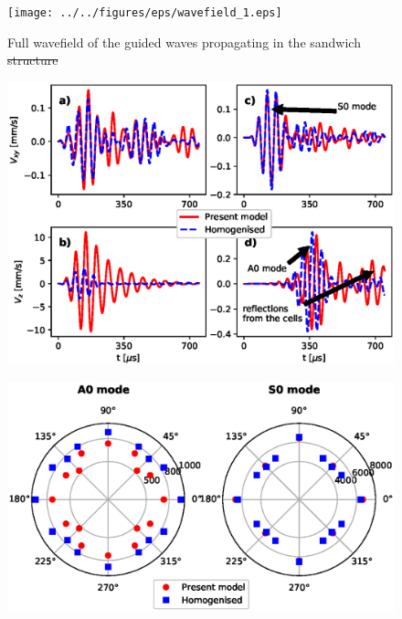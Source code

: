 \documentclass[materials,article,submit,moreauthors,pdftex]{Definitions/mdpi}
\providecommand{\DIFadd}[1]{{\protect\color{blue}{#1}}} %
\providecommand{\DIFdel}[1]{{\protect\color{red}\sout{#1}}}                      %
\providecommand{\DIFaddbegin}{} %
\providecommand{\DIFaddend}{} %
\providecommand{\DIFaddFL}[1]{\DIFadd{#1}} %
\providecommand{\DIFdelFL}[1]{\DIFdel{#1}} %
\providecommand{\DIFaddbeginFL}{} %
\providecommand{\DIFaddendFL}{} %
\providecommand{\DIFdelbeginFL}{} %
\providecommand{\DIFdelendFL}{} %
\begin{document}
\DIFaddbegin \label{comparison}
\DIFaddend \begin{figure}
	\begin{center}
		\DIFdelbeginFL %
\DIFdelendFL \DIFaddbeginFL \texttt{[image: ../../figures/eps/wavefield\_1.eps]}
	\DIFaddendFL \end{center}
	\caption{Full wavefield of the guided waves propagating in the sandwich \DIFdelbeginFL \DIFdelFL{structure}\DIFdelendFL \DIFaddbeginFL \DIFaddFL{for the present model and the homogenised one}\DIFaddendFL }
	\label{fig:wavefield}
\end{figure}
\begin{figure}
	\begin{center}
		\DIFaddbeginFL \includegraphics[width=1\linewidth]{../../figures/eps/velocity.eps}
	\end{center}
	\caption{\DIFaddFL{Particle velocity at point: a, b) P0(-86,0) mm, and c, d) P1(114,0) mm}}
	\label{fig:velocity}
\end{figure}
\begin{figure}
	\begin{center}
		\includegraphics[width=1\linewidth]{../../figures/eps/cg.eps}
	\end{center}
	\caption{\DIFaddFL{Group velocity in the function of propagation angle}}
	\label{fig:speed}
\end{figure}
\end{document}
